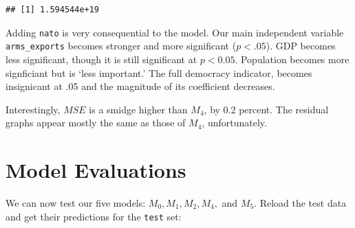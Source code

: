 \documentclass[11pt,]{article}
\begin{document}
\begin{verbatim}
## [1] 1.594544e+19
\end{verbatim}

Adding \texttt{nato} is very consequential to the model. Our main
independent variable \texttt{arms\_exports} becomes stronger and more
significant (\(p < .05\)). GDP becomes less significant, though it is
still significant at \(p < 0.05\). Population becomes more signficiant
but is `less important.' The full democracy indicator, becomes
insignicant at .05 and the magnitude of its coefficient decreases.

Interestingly, \(MSE\) is a smidge higher than \(M_4\), by 0.2 percent.
The residual graphs appear mostly the same as those of \(M_4\),
unfortunately.

\hypertarget{model-evaluations}{%
\section{Model Evaluations}\label{model-evaluations}}

We can now test our five models: \(M_0, M_1, M_2, M_4,\) and \(M_5\).
Reload the test data and get their predictions for the \texttt{test}
set:
\end{document}
